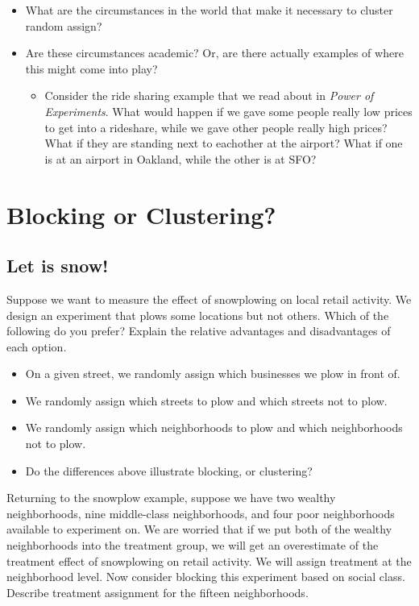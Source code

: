 \documentclass[
]{book}
\providecommand{\tightlist}{%
  \setlength{\itemsep}{0pt}\setlength{\parskip}{0pt}}
\begin{document}
\begin{itemize}
\tightlist
\item
  What are the circumstances in the world that make it necessary to
  cluster random assign?
\item
  Are these circumstances academic? Or, are there actually examples of
  where this might come into play?

  \begin{itemize}
  \tightlist
  \item
    Consider the ride sharing example that we read about in \emph{Power
    of Experiments}. What would happen if we gave some people really low
    prices to get into a rideshare, while we gave other people really
    high prices? What if they are standing next to eachother at the
    airport? What if one is at an airport in Oakland, while the other is
    at SFO?
  \end{itemize}
\end{itemize}

\hypertarget{blocking-or-clustering}{%
\section{Blocking or Clustering?}\label{blocking-or-clustering}}

\hypertarget{let-is-snow}{%
\subsection{Let is snow!}\label{let-is-snow}}

Suppose we want to measure the effect of snowplowing on local retail
activity. We design an experiment that plows some locations but not
others. Which of the following do you prefer? Explain the relative
advantages and disadvantages of each option.

\begin{itemize}
\tightlist
\item
  On a given street, we randomly assign which businesses we plow in
  front of.
\item
  We randomly assign which streets to plow and which streets not to
  plow.
\item
  We randomly assign which neighborhoods to plow and which neighborhoods
  not to plow.
\item
  Do the differences above illustrate blocking, or clustering?
\end{itemize}

Returning to the snowplow example, suppose we have two wealthy
neighborhoods, nine middle-class neighborhoods, and four poor
neighborhoods available to experiment on. We are worried that if we put
both of the wealthy neighborhoods into the treatment group, we will get
an overestimate of the treatment effect of snowplowing on retail
activity. We will assign treatment at the neighborhood level. Now
consider blocking this experiment based on social class. Describe
treatment assignment for the fifteen neighborhoods.
\end{document}
